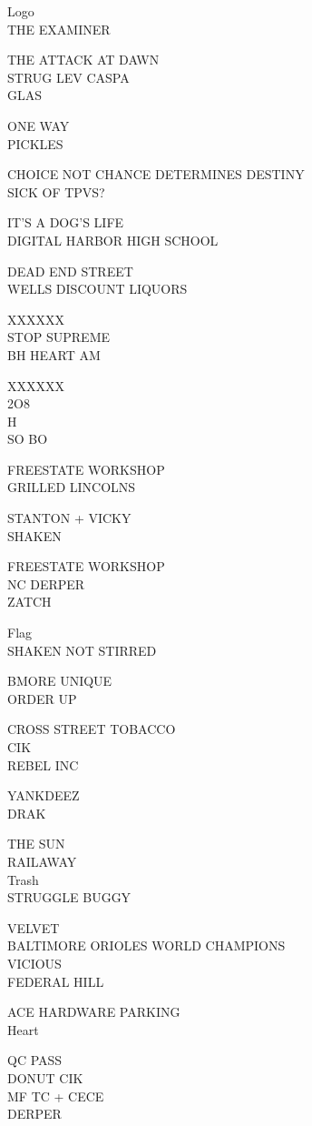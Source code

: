 \documentclass[10pt,letterpaper]{article}
\begin{document}
Logo\\
THE EXAMINER

THE ATTACK AT DAWN\\
STRUG LEV CASPA\\
GLAS

ONE WAY\\
PICKLES

CHOICE NOT CHANCE DETERMINES DESTINY\\
SICK OF TPVS?

IT'S A DOG'S LIFE\\
DIGITAL HARBOR HIGH SCHOOL

DEAD END STREET\\
WELLS DISCOUNT LIQUORS

XXXXXX\\
STOP SUPREME\\
BH HEART AM

XXXXXX\\
2O8\\
H\\
SO BO

FREESTATE WORKSHOP\\
GRILLED LINCOLNS

STANTON + VICKY\\
SHAKEN

FREESTATE WORKSHOP\\
NC DERPER\\
ZATCH

Flag\\
SHAKEN NOT STIRRED

BMORE UNIQUE\\
ORDER UP

CROSS STREET TOBACCO\\
CIK\\
REBEL INC

YANKDEEZ\\
DRAK

THE SUN\\
RAILAWAY\\
Trash\\
STRUGGLE BUGGY

VELVET\\
BALTIMORE ORIOLES WORLD CHAMPIONS\\
VICIOUS\\
FEDERAL HILL

ACE HARDWARE PARKING\\
Heart

QC PASS\\
DONUT CIK\\
MF TC + CECE\\
DERPER
\end{document}

